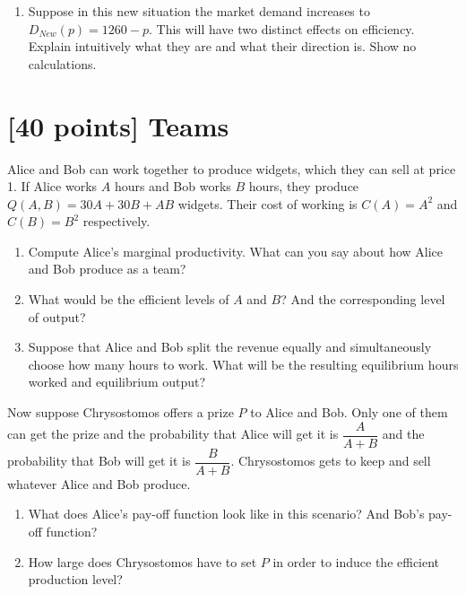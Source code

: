 \documentclass{article}
\begin{document}
\begin{enumerate}[resume*]
  \item Suppose in this new situation the market demand increases to $D_{New}(p)=1260-p$. This will have two distinct effects on efficiency. Explain intuitively what they are and what their direction is. Show no calculations. 
  \end{enumerate}

\section{[40 points] Teams}

Alice and Bob can work together to produce widgets, which they can sell at price 1. If Alice works $A$ hours and Bob works $B$ hours, they produce $Q(A,B)=30A+30B+AB$ widgets. Their cost of working is $C(A)=A^{2}$ and $C(B)=B^{2}$ respectively. 

\begin{enumerate}[label=(\alph*)]
\item Compute Alice's marginal productivity. What can you say about how Alice and Bob produce as a team? 
\item What would be the efficient levels of $A$ and $B$? And the corresponding level of output?
\item Suppose that Alice and Bob split the revenue equally and simultaneously choose how many hours to work. What will be the resulting equilibrium hours worked and equilibrium output?
\end{enumerate}
Now suppose Chrysostomos offers a prize $P$ to Alice and Bob. Only one of them can get the prize and the probability that Alice will get it is $\dfrac{A}{A+B}$ and the probability that Bob will get it is $\dfrac B{A+B}$. Chrysostomos gets to keep and sell whatever Alice and Bob produce.

\begin{enumerate}[resume*]
  \item What does Alice's pay-off function look like in this scenario? And Bob's pay-off function?
  \item How large does Chrysostomos have to set $P$ in order to induce the efficient production level?
\end{enumerate}
\end{document}
